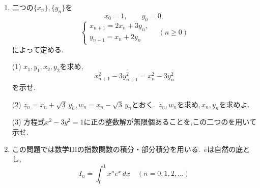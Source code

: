 \begin{enumerate}[label=\textbf{問\arabic*.},leftmargin=3.8em,format=\bookitemlink{practice-bridge}{problem}{answer}]
                \[
                  a_1=1,\qquad a_{n+1}=a_n-\frac12a_n^2
                  \quad(n\ge1)
                \]
                によって定める.
                \par\smallskip\noindent
                (1) すべての$\displaystyle n\ge1$について$\displaystyle 0<a_{n+1}<a_n\le1$を示せ.
                \par\smallskip\noindent
                (2) $\displaystyle b_n=\frac1{a_n}$とおく.\,
                $\displaystyle b_{n+1}-b_n$を$\displaystyle a_n$で表し,
                \[
                  \frac12\le b_{n+1}-b_n\le1
                \]
                を示せ.
                \par\smallskip\noindent
                (3) (2)の不等式を足し合わせ,
                \[
                  \frac1n\le a_n\le\frac2{n+1}
                \]
                を示せ.さらに,\,$\displaystyle \lim_{n\to\infty}a_n$を求めよ.
          \item 二つの$\displaystyle \{x_n\},\{y_n\}$を
                \[
                  x_0=1,\qquad y_0=0,
                \]
                \[
                  \begin{cases}
                    x_{n+1}=2x_n+3y_n,\\
                    y_{n+1}=x_n+2y_n
                  \end{cases}
                  \quad(n\ge0)
                \]
                によって定める.
                \par\smallskip\noindent
                (1) $\displaystyle x_1,y_1,x_2,y_2$を求め,
                \[
                  x_{n+1}^2-3y_{n+1}^2=x_n^2-3y_n^2
                \]
                を示せ.
                \par\smallskip\noindent
                (2) $\displaystyle z_n=x_n+\sqrt3\,y_n$,\,$\displaystyle w_n=x_n-\sqrt3\,y_n$とおく.\,
                $\displaystyle z_n,w_n$を求め,\,$\displaystyle x_n,y_n$を求めよ.
                \par\smallskip\noindent
                (3) 方程式$\displaystyle x^2-3y^2=1$に正の整数解が無限個あることを,この二つのを用いて示せ.
          \item この問題では数学IIIの指数関数の積分・部分積分を用いる.\,
                $\displaystyle e$は自然の底とし,
                \[
                  I_n=\int_0^1 x^n e^x\,dx
                  \quad(n=0,1,2,\ldots)
                \]

\end{enumerate}
